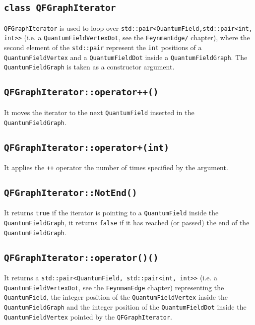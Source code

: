 \subsection{\texttt{class QFGraphIterator}}
\texttt{QFGraphIterator} is used to loop over \texttt{std::pair<QuantumField,std::pair<int, int>>} (i.e. a \texttt{QuantumFieldVertexDot}, see the \texttt{FeynmanEdge/} chapter), where the second element of the \texttt{std::pair} represent the \texttt{int} positions of a \texttt{QuantumFieldVertex} and a \texttt{QuantumFieldDot} inside a \texttt{QuantumFieldGraph}. The \texttt{QuantumFieldGraph} is taken as a constructor argument.
\subsection{\texttt{QFGraphIterator::operator++()}}
It moves the iterator to the next \texttt{QuantumField} inserted in the \texttt{QuantumFieldGraph}.
\subsection{\texttt{QFGraphIterator::operator+(int)}}
It applies the \texttt{++} operator the number of times specified by the argument.
\subsection{\texttt{QFGraphIterator::NotEnd()}}
It returns \texttt{true} if the iterator is pointing to a \texttt{QuantumField} inside the \texttt{QuantumFieldGraph}, it returns \texttt{false} if it has reached (or passed) the end of the \texttt{QuantumFieldGraph}.
\subsection{\texttt{QFGraphIterator::operator()()}}
It returns a \texttt{std::pair<QuantumField, std::pair<int, int>>} (i.e. a \texttt{QuantumFieldVertexDot}, see the \texttt{FeynmanEdge} chapter) representing the \texttt{QuantumField}, the integer position of the \texttt{QuantumFieldVertex} inside the \texttt{QuantumFieldGraph} and the integer position of the \texttt{QuantumFieldDot} inside the \texttt{QuantumFieldVertex} pointed by the \texttt{QFGraphIterator}.


